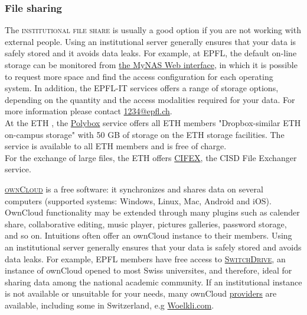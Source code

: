 \subsubsection{File sharing}

\noindent The \textsc{institutional file share} is usually a good option if you are not working with external people.  Using an institutional server generally ensures that your data is safely stored and it avoids data leaks. For example, at EPFL, the default on-line storage can be monitored from \href{http://mynas.epfl.ch}{the MyNAS Web interface}, in which it is possible to request more space and find the access configuration for each operating system. In addition, the EPFL-IT services offers a range of storage options, depending on the quantity and the access modalities required for your data. For more information please contact \href{mailto:1234@epfl.ch}{1234@epfl.ch}. \\
At the ETH , the \href{http://polybox.ethz.ch}{Polybox} service offers all ETH members "Dropbox-similar ETH on-campus storage" with 50 GB of storage on the ETH storage facilities. The service is available to all ETH members and is free of charge.\\
For the exchange of large files, the ETH offers \href{http://cifex.ethz.ch}{CIFEX}, the CISD File Exchanger service. 

\vspace{0.4cm}

\noindent \label{ownCloud}  \textsc{\href{http://owncloud.org}{ownCloud}} is a free software: it synchronizes and shares data on several computers (supported systems: Windows, Linux, Mac, Android and iOS). OwnCloud functionality may be extended through many plugins such as calender share, collaborative editing, music player, pictures galleries, password storage, and so on. Intuitions often offer an ownCloud instance to their members. Using an institutional server generally ensures that your data is safely stored and avoids data leaks. For example, EPFL members have free access to \textsc{\href{http://drive.switch.ch}{SwitchDrive}}, an instance of ownCloud opened to most Swiss universites, and therefore, ideal for sharing data among the national academic community\cite{owncloud_owncloud.org_2015,switchdrive_switchdrive_2015}. If an institutional instance is not available or unsuitable for your  needs, many ownCloud \href{https://owncloud.org/providers/}{providers} are available\cite{owncloud.org_owncloud_2015}, including some in Switzerland, e.g \href{https://woelkli.com}{Woelkli.com}\cite{woelkli_secure_2015}.   

